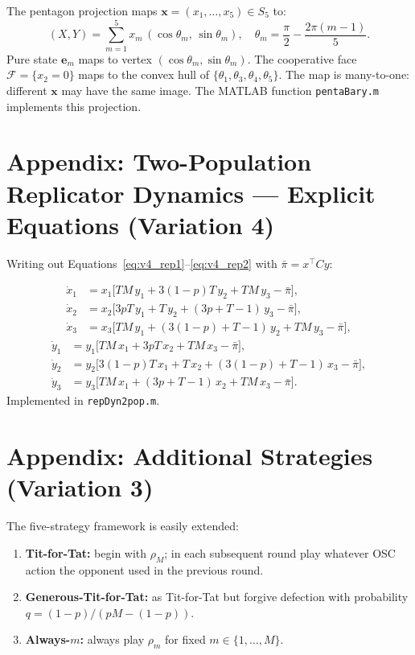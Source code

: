 \documentclass[12pt,a4paper]{article}
\begin{document}
The pentagon projection maps $\mathbf{x}=(x_1,\ldots,x_5)\in S_5$ to:
\[
  (X,Y) = \sum_{m=1}^5 x_m\,(\cos\theta_m,\,\sin\theta_m),
  \quad \theta_m = \frac{\pi}{2} - \frac{2\pi(m-1)}{5}.
\]
Pure state $\mathbf{e}_m$ maps to vertex $(\cos\theta_m,\sin\theta_m)$.
The cooperative face $\mathcal{F}=\{x_2=0\}$ maps to the convex hull of
$\{\theta_1,\theta_3,\theta_4,\theta_5\}$. The map is many-to-one: different
$\mathbf{x}$ may have the same image. The MATLAB function \texttt{pentaBary.m}
implements this projection.

\section{Appendix: Two-Population Replicator Dynamics --- Explicit Equations
(Variation 4)}

Writing out Equations~\eqref{eq:v4_rep1}--\eqref{eq:v4_rep2} with
$\bar\pi = x^\top Cy$:

\begin{align*}
\dot x_1 &= x_1\bigl[TM\,y_1 + 3(1-p)T\,y_2 + TM\,y_3 - \bar\pi\bigr],\\
\dot x_2 &= x_2\bigl[3pT\,y_1 + T\,y_2 + (3p+T-1)\,y_3 - \bar\pi\bigr],\\
\dot x_3 &= x_3\bigl[TM\,y_1 + (3(1-p)+T-1)\,y_2 + TM\,y_3 - \bar\pi\bigr],
\end{align*}
\begin{align*}
\dot y_1 &= y_1\bigl[TM\,x_1 + 3pT\,x_2 + TM\,x_3 - \bar\pi\bigr],\\
\dot y_2 &= y_2\bigl[3(1-p)T\,x_1 + T\,x_2 + (3(1-p)+T-1)\,x_3 - \bar\pi\bigr],\\
\dot y_3 &= y_3\bigl[TM\,x_1 + (3p+T-1)\,x_2 + TM\,x_3 - \bar\pi\bigr].
\end{align*}
Implemented in \texttt{repDyn2pop.m}.

\section{Appendix: Additional Strategies (Variation 3)}

The five-strategy framework is easily extended:
\begin{enumerate}
  \item \textbf{Tit-for-Tat:} begin with $\rho_M$; in each subsequent round
        play whatever OSC action the opponent used in the previous round.
  \item \textbf{Generous-Tit-for-Tat:} as Tit-for-Tat but forgive defection
        with probability $q=(1-p)/(pM-(1-p))$.
  \item \textbf{Always-$m$:} always play $\rho_m$ for fixed $m\in\{1,\ldots,M\}$.
\end{enumerate}
\end{document}
